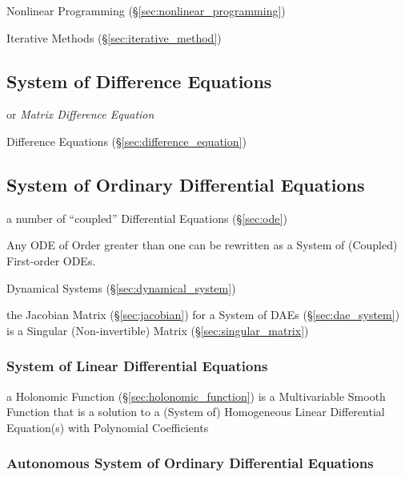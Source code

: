 \fist Nonlinear Programming (\S\ref{sec:nonlinear_programming})

\fist Iterative Methods (\S\ref{sec:iterative_method})



\subsection{System of Difference Equations}
\label{sec:difference_equation_system}

or \emph{Matrix Difference Equation}

Difference Equations (\S\ref{sec:difference_equation})



\subsection{System of Ordinary Differential Equations}\label{sec:ode_system}

a number of ``coupled'' Differential Equations (\S\ref{sec:ode})

Any ODE of Order greater than one can be rewritten as a System of (Coupled)
First-order ODEs.

\fist Dynamical Systems (\S\ref{sec:dynamical_system})

\fist the Jacobian Matrix (\S\ref{sec:jacobian}) for a System of DAEs
(\S\ref{sec:dae_system}) is a Singular (Non-invertible) Matrix
(\S\ref{sec:singular_matrix})



\subsubsection{System of Linear Differential Equations}
\label{sec:linear_ode_system}

a Holonomic Function (\S\ref{sec:holonomic_function}) is a Multivariable Smooth
Function that is a solution to a (System of) Homogeneous Linear Differential
Equation(s) with Polynomial Coefficients



\subsubsection{Autonomous System of Ordinary Differential Equations}
\label{sec:autonomous_ode_system}

